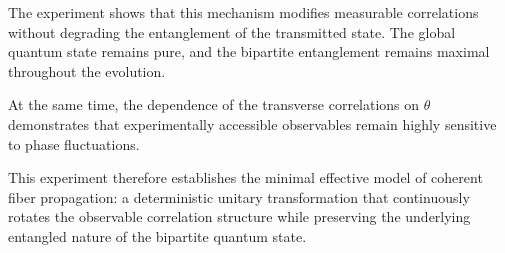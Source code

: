 The experiment shows that this mechanism modifies measurable correlations without degrading the entanglement of the transmitted state. The global quantum state remains pure, and the bipartite entanglement remains maximal throughout the evolution.

At the same time, the dependence of the transverse correlations on \( \theta \) demonstrates that experimentally accessible observables remain highly sensitive to phase fluctuations.

This experiment therefore establishes the minimal effective model of coherent fiber propagation: a deterministic unitary transformation that continuously rotates the observable correlation structure while preserving the underlying entangled nature of the bipartite quantum state.